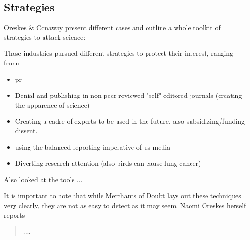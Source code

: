 \subsection{Strategies}
Oreskes \& Conaway present different cases and outline a whole toolkit of strategies to attack science:

These industries pursued different strategies to protect their interest, ranging from:
\begin{itemize}
\item \gls{pr}
\item Denial and publishing in non-peer reviewed "self"-editored journals (creating the apparence of science)
\item Creating a cadre of experts to be used in the future. also subsidizing/funding dissent.
\item using the balanced reporting imperative of us media
\item Diverting research attention (also birds can cause lung cancer) 
\end{itemize}


Also \cite{abdalla_grey_2021} looked at the tools ...

It is important to note that while Merchants of Doubt lays out these techniques very clearly, they are not as easy to detect as it may seem. Naomi Oreskes herself reports \begin{quote}
....
\end{quote} \citep{oreskes_merchants_2010} 

\newpage